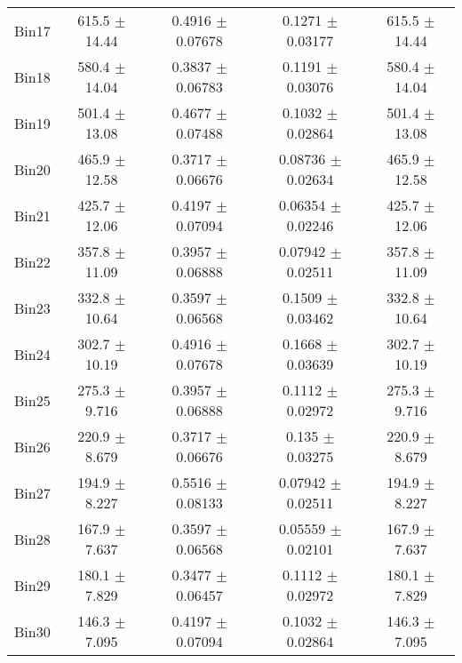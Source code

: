 \begin{tabular}{@{\extracolsep{4pt}}lcccc@{}}
     Bin17 & 615.5 $\pm$ 14.44 & 0.4916 $\pm$ 0.07678 & 0.1271 $\pm$ 0.03177 & 615.5 $\pm$ 14.44 \\ 
     Bin18 & 580.4 $\pm$ 14.04 & 0.3837 $\pm$ 0.06783 & 0.1191 $\pm$ 0.03076 & 580.4 $\pm$ 14.04 \\ 
     Bin19 & 501.4 $\pm$ 13.08 & 0.4677 $\pm$ 0.07488 & 0.1032 $\pm$ 0.02864 & 501.4 $\pm$ 13.08 \\ 
     Bin20 & 465.9 $\pm$ 12.58 & 0.3717 $\pm$ 0.06676 & 0.08736 $\pm$ 0.02634 & 465.9 $\pm$ 12.58 \\ 
     Bin21 & 425.7 $\pm$ 12.06 & 0.4197 $\pm$ 0.07094 & 0.06354 $\pm$ 0.02246 & 425.7 $\pm$ 12.06 \\ 
     Bin22 & 357.8 $\pm$ 11.09 & 0.3957 $\pm$ 0.06888 & 0.07942 $\pm$ 0.02511 & 357.8 $\pm$ 11.09 \\ 
     Bin23 & 332.8 $\pm$ 10.64 & 0.3597 $\pm$ 0.06568 & 0.1509 $\pm$ 0.03462 & 332.8 $\pm$ 10.64 \\ 
     Bin24 & 302.7 $\pm$ 10.19 & 0.4916 $\pm$ 0.07678 & 0.1668 $\pm$ 0.03639 & 302.7 $\pm$ 10.19 \\ 
     Bin25 & 275.3 $\pm$ 9.716 & 0.3957 $\pm$ 0.06888 & 0.1112 $\pm$ 0.02972 & 275.3 $\pm$ 9.716 \\ 
     Bin26 & 220.9 $\pm$ 8.679 & 0.3717 $\pm$ 0.06676 & 0.135 $\pm$ 0.03275 & 220.9 $\pm$ 8.679 \\ 
     Bin27 & 194.9 $\pm$ 8.227 & 0.5516 $\pm$ 0.08133 & 0.07942 $\pm$ 0.02511 & 194.9 $\pm$ 8.227 \\ 
     Bin28 & 167.9 $\pm$ 7.637 & 0.3597 $\pm$ 0.06568 & 0.05559 $\pm$ 0.02101 & 167.9 $\pm$ 7.637 \\ 
     Bin29 & 180.1 $\pm$ 7.829 & 0.3477 $\pm$ 0.06457 & 0.1112 $\pm$ 0.02972 & 180.1 $\pm$ 7.829 \\ 
     Bin30 & 146.3 $\pm$ 7.095 & 0.4197 $\pm$ 0.07094 & 0.1032 $\pm$ 0.02864 & 146.3 $\pm$ 7.095 \\ 
\hline\hline
  \end{tabular}
